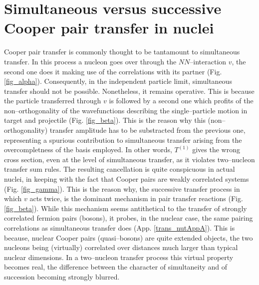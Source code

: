 \documentclass[a4paper,11pt]{book}
\numberwithin{equation}{section}
\numberwithin{figure}{section}
\numberwithin{table}{section}
\begin{document}
\section[Simultaneous versus successive transfer]{Simultaneous versus successive Cooper pair transfer in nuclei}
Cooper pair transfer is commonly thought to be tantamount to simultaneous transfer. In this process a nucleon goes over through the $NN$--interaction $v$, the second one does it making use of the correlations with its partner (Fig. \ref{fig_alpha}). Consequently, in the independent particle limit, simultaneous  transfer should not be possible. Nonetheless, it remains operative. This is because the particle transferred through $v$ is followed by a second one which profits of the non--orthogonality of the wavefunctions describing the single--particle motion in target and projectile (Fig. \ref{fig_beta}). This is the reason why this (non--orthogonality) transfer amplitude has to be substracted from the previous one, representing a spurious contribution to simultaneous transfer arising from the overcompletness of the basis employed. In other words, $T^{(1)}$ gives the wrong cross section, even at the level of simultaneous transfer, as it violates two--nucleon transfer sum rules. The resulting cancellation is quite conspicuous in actual nuclei, in keeping with the fact that Cooper pairs are weakly correlated systems (Fig. \ref{fig_gamma}). This is the reason why, the successive transfer process in which $v$ acts twice, is the dominant mechanism in pair transfer reactions (Fig. \ref{fig_beta}). While this mechanism seems antithetical to the transfer of strongly correlated fermion pairs (bosons), it probes, in the nuclear case, the same pairing correlations as simultaneous transfer does (App. \ref{trans_nutAppA}). This is because, nuclear Cooper pairs (quasi--bosons) are quite extended objects, the two nucleons being (virtually) correlated over distances much larger than typical nuclear dimensions. In a two--nucleon transfer process this virtual property becomes real, the difference between the character of simultaneity and of succession becoming strongly blurred.
\end{document}
